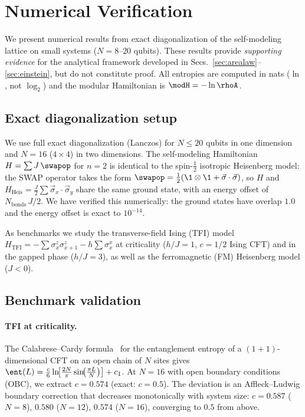 \section{Numerical Verification}
\label{sec:numerical}

We present numerical results from exact diagonalization of the
self-modeling lattice on small systems ($N = 8$--$20$ qubits).  These
results provide \emph{supporting evidence} for the analytical framework
developed in Secs.~\ref{sec:arealaw}--\ref{sec:einstein}, but do not
constitute proof.  All entropies are computed in nats ($\ln$, not
$\log_2$) and the modular Hamiltonian is $\modH = -\ln\rhoA$.

\subsection{Exact diagonalization setup}
\label{sec:ed-setup}

We use full exact diagonalization (Lanczos) for $N \leq 20$ qubits
in one dimension and $N = 16$ ($4 \times 4$) in two dimensions.  The
self-modeling Hamiltonian $H = \sum J\,\swapop$ for $n = 2$ is
identical to the spin-$\tfrac{1}{2}$ isotropic Heisenberg model: the
SWAP operator takes the form $\swapop = \frac{1}{2}(\1 \otimes \1 +
\vec{\sigma}\cdot\vec{\sigma})$, so $H$ and
$H_{\mathrm{Heis}} = \frac{J}{2}\sum
\vec{\sigma}_x \cdot \vec{\sigma}_y$ share the same ground state, with
an energy offset of $N_{\mathrm{bonds}}\, J/2$.  We have verified
this numerically: the ground states have overlap $1.0$ and the energy
offset is exact to $10^{-14}$.

As benchmarks we study the transverse-field Ising (TFI) model
$H_{\mathrm{TFI}} = -\sum \sigma^z_x \sigma^z_{x+1} - h\sum
\sigma^x_x$ at criticality ($h/J = 1$, $c = 1/2$ Ising CFT) and in
the gapped phase ($h/J = 3$), as well as the ferromagnetic (FM)
Heisenberg model ($J < 0$).

\subsection{Benchmark validation}
\label{sec:benchmarks}

\paragraph{TFI at criticality.}
The Calabrese--Cardy formula~\cite{CalabreseCardy2004} for the
entanglement entropy of a $(1{+}1)$-dimensional CFT on an open chain
of $N$ sites gives
$\ent(L) = \tfrac{c}{6}\ln\!\bigl[\tfrac{2N}{\pi}
\sin\!\bigl(\tfrac{\pi L}{N}\bigr)\bigr] + c_1$.
At $N = 16$ with open boundary conditions (OBC), we extract
$c = 0.574$ (exact: $c = 0.5$).  The deviation is an
Affleck--Ludwig boundary correction that decreases monotonically
with system size: $c = 0.587$ ($N = 8$), $0.580$ ($N = 12$),
$0.574$ ($N = 16$), converging to $0.5$ from above.

